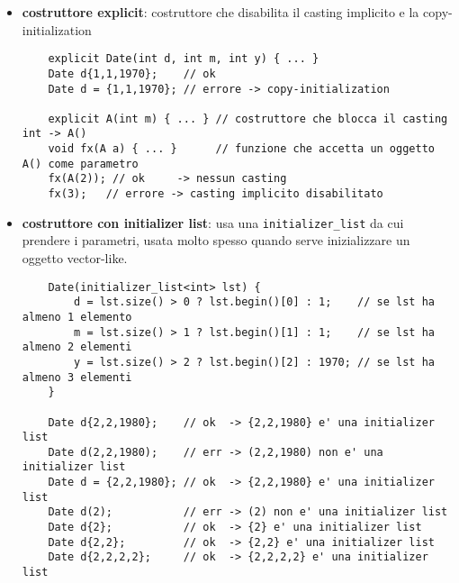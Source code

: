 \documentclass[a4paper]{article}
\begin{document}
\begin{itemize}
\item \textbf{costruttore explicit}: costruttore che disabilita il casting implicito e la copy-initialization
\begin{lstlisting}
	explicit Date(int d, int m, int y) { ... }
	Date d{1,1,1970};    // ok
	Date d = {1,1,1970}; // errore -> copy-initialization

	explicit A(int m) { ... } // costruttore che blocca il casting int -> A()
	void fx(A a) { ... }      // funzione che accetta un oggetto A() come parametro
	fx(A(2)); // ok     -> nessun casting
	fx(3);   // errore -> casting implicito disabilitato
\end{lstlisting}

\item \textbf{costruttore con initializer list}: usa una \verb|initializer_list| da cui prendere i parametri, usata molto spesso
quando serve inizializzare un oggetto vector-like.
\begin{lstlisting}
	Date(initializer_list<int> lst) {
		d = lst.size() > 0 ? lst.begin()[0] : 1;    // se lst ha almeno 1 elemento
		m = lst.size() > 1 ? lst.begin()[1] : 1;    // se lst ha almeno 2 elementi
		y = lst.size() > 2 ? lst.begin()[2] : 1970; // se lst ha almeno 3 elementi
	}

	Date d{2,2,1980};    // ok  -> {2,2,1980} e' una initializer list
	Date d(2,2,1980);    // err -> (2,2,1980) non e' una initializer list
	Date d = {2,2,1980}; // ok  -> {2,2,1980} e' una initializer list
	Date d(2);           // err -> (2) non e' una initializer list
	Date d{2};           // ok  -> {2} e' una initializer list
	Date d{2,2};         // ok  -> {2,2} e' una initializer list
	Date d{2,2,2,2};     // ok  -> {2,2,2,2} e' una initializer list
\end{lstlisting}
\end{itemize}
\end{document}
